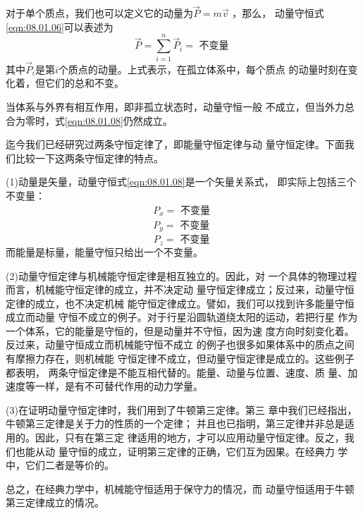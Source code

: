 \documentclass[../outline-of-mechanics.tex]{subfiles}
\begin{document}
对于单个质点，我们也可以定义它的动量为$ \vec { P } = m \vec { v } $ ，那么，
动量守恒\lhbrak 式\eqref{eqn:08.01.06}\rhbrak 可以表述为
\begin{equation}\label{eqn:08.01.08}
  \vec { P } = \sum _ { i = 1 } ^ { n } \vec { P } _ { i } = \text { 不变量 }
\end{equation}
其中$ \vec { P } _ { i } $是第$ i $个质点的动量。上式表示，在孤立体系中，每个质点
的动量时刻在变化着，但它们的总和不变。

当体系与外界有相互作用，即非孤立状态时，动量守恒一般
不成立，但当外力总合为零时，式\eqref{eqn:08.01.08}仍然成立。

迄今我们已经研究过两条守恒定律了，即能量守恒定律与动
量守恒定律。下面我们比较一下这两条守恒定律的特点。

(1)动量是矢量，动量守恒\lhbrak 式\eqref{eqn:08.01.08}\rhbrak 是一个矢量关系式，
即实际上包括三个不变量：
\begin{equation*}
  \begin{aligned}
    P _ { x } = \text { 不变量 } \\
    P _ { y } = \text { 不变量 }
  \end{aligned}
\end{equation*}
\begin{equation}\label{eqn:08.01.09}
  P _ { z } = \text { 不变量 }
\end{equation}
而能量是标量，能量守恒只给出一个不变量。

(2)动量守恒定律与机械能守恒定律是相互独立的。因此，对
一个具体的物理过程而言，机械能守恒定律的成立，并不决定动
量守恒定律成立；反过来，动量守恒定律的成立，也不决定机械
能守恒定律成立。譬如，我们可以找到许多能量守恒成立而动量
守恒不成立的例子。对于行星沿圆轨道绕太阳的运动，若把行星
作为一个体系，它的能量是守恒的，但是动量并不守恒，因为速
度方向时刻变化着。反过来，动量守恒成立而机械能守恒不成立
的例子也很多如果体系中的质点之间有摩擦力存在，则机械能
守恒定律不成立，但动量守恒定律是成立的。这些例子都表明，
两条守恒定律是不能互相代替的。能量、动量与位置、速度、质
量、加速度等一样，是有不可替代作用的动力学量。

(3)在证明动量守恒定律时，我们用到了牛顿第三定律。第三
章中我们已经指出，牛顿第三定律是关于力的性质的一个定律；
并且也已指明，第三定律并非总是适用的。因此，只有在第三定
律适用的地方，才可以应用动量守恒定律。反之，我们也能从动
量守恒的成立，证明第三定律的正确，它们互为因果。在经典力
学中，它们二者是等价的。

总之，在经典力学中，机械能守恒适用于保守力的情况，而
动量守恒适用于牛顿第三定律成立的情况。
\end{document}

